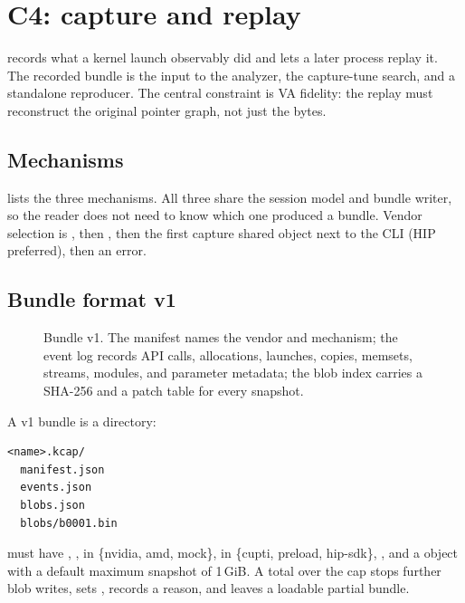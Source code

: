 \section{C4: capture and replay}
\label{sec:c4}

 records what a kernel launch observably did and lets
a later process replay it. The recorded bundle is the input to the analyzer,
the capture-tune search, and a standalone reproducer. The central constraint is
VA fidelity: the replay must reconstruct the original pointer graph, not just
the bytes.

\subsection{Mechanisms}
\label{sec:c4-mechanisms}

 lists the three mechanisms. All three share the
 session model and bundle writer, so the reader does
not need to know which one produced a bundle. Vendor selection is
, then , then the first capture shared
object next to the CLI (HIP preferred), then an error.

\subsection{Bundle format v1}
\label{sec:c4-format}

\begin{figure}[htbp]
\centering
\resizebox{\textwidth}{!}{}
\caption{Bundle v1. The manifest names the vendor and mechanism; the event log
records API calls, allocations, launches, copies, memsets, streams, modules,
and parameter metadata; the blob index carries a SHA-256 and a patch table for
every snapshot.}
\label{fig:capture}
\end{figure}

A v1 bundle is a directory:
\begin{lstlisting}
<name>.kcap/
  manifest.json
  events.json
  blobs.json
  blobs/b0001.bin
\end{lstlisting}

 must have ,
,  in \{nvidia, amd, mock\},
 in \{cupti, preload, hip-sdk\},
, and a  object with a
default maximum snapshot of 1\,GiB. A total over the cap stops further blob
writes, sets , records a reason, and leaves a loadable
partial bundle.

